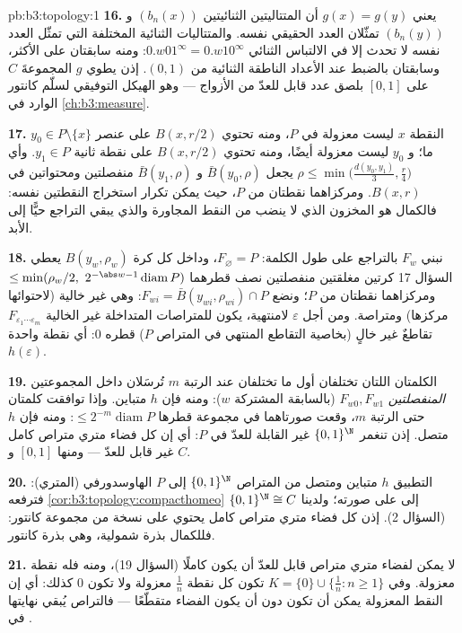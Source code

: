 \begin{solution}{pb:b3:topology:1}
\textbf{16.} يعني $g(x) = g(y)$ أن المتتاليتين الثنائيتين
$(b_n(x))$ و $(b_n(y))$ تمثّلان العدد الحقيقي نفسه. والمتتاليات
الثنائية المختلفة التي تمثّل العدد نفسه لا تحدث إلا في
الالتباس الثنائي $0.w01^\infty = 0.w10^\infty$: ومنه سابقتان على الأكثر، وسابقتان
بالضبط عند الأعداد الناطقة الثنائية من $(0,1)$. إذن يطوي $g$
المجموعةَ $C$ على $[0,1]$ بلصق عدد قابل للعدّ من الأزواج --- وهو
الهيكل التوفيقي لسلّم كانتور الوارد في \cref{ch:b3:measure}.

\textbf{17.} النقطة $x$ ليست معزولة في $P$، ومنه تحتوي
$B(x, r/2)$ على عنصر $y_0 \in P \setminus \{x\}$ ما؛ و $y_0$ ليست معزولة أيضًا،
ومنه تحتوي $B(x, r/2)$ على نقطة ثانية $y_1
\in P$. وأي $\rho \leq \min\bigl(\frac{d(y_0,y_1)}3,
\frac r4\bigr)$
يجعل $\bar B(y_0, \rho)$ و $\bar B(y_1,
\rho)$ منفصلتين ومحتواتين في $B(x, r)$.
ومركزاهما نقطتان من $P$، حيث يمكن تكرار استخراج النقطتين نفسه:
فالكمال هو المخزون الذي لا ينضب من النقط المجاورة والذي يبقي
التراجع حيًّا إلى الأبد.

\textbf{18.} نبني $F_w$ بالتراجع على طول الكلمة: $F_\varnothing = P$،
وداخل كل كرة $B(y_w, \rho_w)$ يعطي السؤال 17 كرتين مغلقتين
منفصلتين نصف قطرهما $\leq
\min(\rho_w/2,\ 2^{-\abs w-1}\operatorname{diam}P)$ ومركزاهما نقطتان من $P$؛ ونضع
$F_{wi} = \bar B(y_{wi}, \rho_{wi})
\cap P$: وهي غير خالية (لاحتوائها مركزها) ومتراصة. ومن أجل
$\varepsilon$ لامنتهية، يكون للمتراصات المتداخلة غير الخالية
$F_{\varepsilon_1\cdots\varepsilon_m}$ تقاطعٌ غير خالٍ (بخاصية التقاطع المنتهي في المتراص
$P$) قطره $0$: أي نقطة واحدة $h(\varepsilon)$.

\textbf{19.} الكلمتان اللتان تختلفان أول ما تختلفان عند الرتبة
$m$ تُرسَلان داخل المجموعتين \emph{المنفصلتين} $F_{w0}, F_{w1}$
(بالسابقة المشتركة $w$): ومنه فإن $h$ متباين. وإذا توافقت
كلمتان حتى الرتبة $m$، وقعت صورتاهما في مجموعة قطرها $\leq
2^{-m}\operatorname{diam}P$:
ومنه فإن $h$ متصل. إذن تنغمر $\{0,1\}^\N$ غير القابلة للعدّ في $P$:
أي إن كل فضاء متري متراص كامل غير قابل للعدّ --- ومنها $[0,1]$
و $C$.

\textbf{20.} التطبيق $h$ متباين ومتصل من المتراص $\{0,1\}^\N$
إلى $P$ الهاوسدورفي (المتري): فترفعه \cref{cor:b3:topology:compacthomeo} إلى  على صورته؛ ولدينا $\{0,1\}^\N \cong C$ (السؤال 2). إذن كل فضاء
متري متراص كامل يحتوي على نسخة من مجموعة كانتور: فللكمال بذرة
شمولية، وهي بذرة كانتور.

\textbf{21.} لا يمكن لفضاء متري متراص قابل للعدّ أن يكون كاملًا
(السؤال 19)، ومنه فله نقطة معزولة. وفي $K =
\{0\}\cup\{\frac1n : n \geq 1\}$ تكون كل نقطة
$\frac1n$ معزولة ولا تكون $0$ كذلك: أي إن النقط المعزولة يمكن
أن تكون  دون أن يكون الفضاء متقطّعًا --- فالتراص يُبقي
نهايتها في .


\end{solution}
